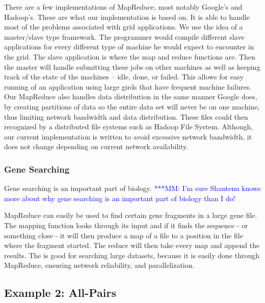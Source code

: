 \documentclass{rspublic}
\newcommand{\michaelnote}[1]{ {\textcolor{blue} { ***MM: #1 }}}
\newcommand{\michaelnote}[1]{ {\textcolor{blue} { ***MM: #1 }}}
\begin{document}
There are a few implementations of MapReduce, most notably Google's and
Hadoop's.  These are what our implementation is based on.  It is able
to handle most of the problems associated with grid applications.  We use
the idea of a master/slave type framework.  The programmer would compile
different slave applications for every different type of machine he 
would expect to encounter in the grid.  The slave application is
where the map and reduce functions are.  Then the master will handle
submitting these jobs on other machines as well as keeping track of
the state of the machines -- idle, done, or failed.  This allows for
easy running of an application using large girds that have frequent
machine failures.  Our MapReduce also handles data distribution in the
same manner Google does, by creating partitions of data so the entire
data set will never be on one machine, thus limiting network bandwidth
and data distribution.  These files could then recognized by a
distributed file systems such as Hadoop File System.  Although, our
current implementation is written to avoid excessive network
bandwidth, it does not change depending on current network
availability.

\subsubsection{Gene Searching}

Gene searching is an important part of biology.
\michaelnote{I'm sure Shantenu knows more about why gene searching is 
an important part of biology than I do!}

MapReduce can easily be used to find certain gene fragments in a large gene 
file.  The mapping function looks through its input and if it finds the 
sequence - or something close - it will then produce a map of a file to a 
position in the file where the fragment started.  The reduce will then take 
every map and append the results.  The is good for searching large datasets, 
because it is easily done through MapReduce, ensuring network reliability, and 
parallelization.  

\subsection{Example 2: All-Pairs}
\end{document}
